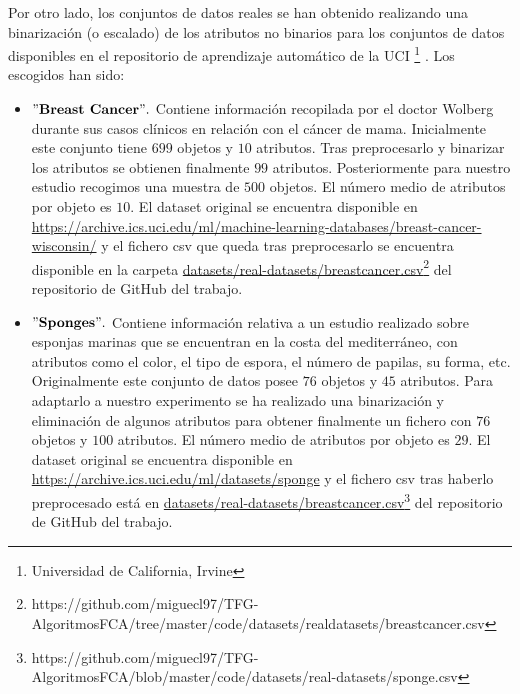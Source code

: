 \documentclass[oneside,openright,titlepage,numbers=noenddot,openany,headinclude,footinclude=true,
cleardoublepage=empty,abstractoff,BCOR=5mm,paper=a4,fontsize=12pt,main=spanish]{scrreprt}
\begin{document}
Por otro lado, los conjuntos de datos reales se han obtenido realizando una binarización \cite{binarization} (o escalado) de los atributos no binarios para los conjuntos de datos disponibles en el repositorio de aprendizaje automático de la UCI \footnote{Universidad de California, Irvine} \cite{uci}. Los escogidos  han sido:

\begin{itemize}
    \item $"\textbf{Breast Cancer}".$ Contiene información recopilada por el doctor Wolberg \cite{breast} durante sus casos clínicos en relación con el cáncer de mama. Inicialmente este conjunto tiene $699$ objetos y $10$ atributos. Tras preprocesarlo y binarizar los atributos se obtienen finalmente $99$ atributos. Posteriormente para nuestro estudio recogimos una muestra de $500$ objetos. El número medio de atributos por objeto es $10$. El dataset original se encuentra disponible en \href{https://archive.ics.uci.edu/ml/machine-learning-databases/breast-cancer-wisconsin/}{https://archive.ics.uci.edu/\linebreak ml/machine-learning-databases/breast-cancer-wisconsin/} y el fichero csv que queda tras preprocesarlo se encuentra disponible en la carpeta \href{https://github.com/miguecl97/TFG-AlgoritmosFCA/tree/master/code/datasets/real-datasets/breastcancer.csv}{datasets/real-datasets/breastcancer.csv}\footnote{https://github.com/miguecl97/TFG-AlgoritmosFCA/tree/master/code/datasets/real\-datasets/breastcancer.csv} del repositorio de GitHub del trabajo.
    \item $"\textbf{Sponges}".$ Contiene información relativa a un estudio realizado sobre esponjas marinas que se encuentran en la costa del mediterráneo, con atributos como el color, el tipo de espora, el número de papilas, su forma, etc. Originalmente este conjunto de datos posee $76$ objetos y $45$ atributos. Para adaptarlo a nuestro experimento se ha realizado una binarización y eliminación de algunos atributos para obtener finalmente un fichero con $76$ objetos y $100$ atributos. El número medio de atributos por objeto es $29$. El dataset original se encuentra disponible en \href{https://archive.ics.uci.edu/ml/datasets/sponge}{https://archive.ics.uci.edu/ml/datasets/sponge} y el fichero csv tras haberlo preprocesado está en \href{https://github.com/miguecl97/TFG-AlgoritmosFCA/blob/master/code/datasets/real-datasets/sponge.csv}{datasets/real-datasets/breastcancer.csv}\footnote{https://github.com/miguecl97/TFG-AlgoritmosFCA/blob/master/code/datasets/real-datasets/sponge.csv} del repositorio de GitHub del trabajo.
\end{itemize}
\end{document}
